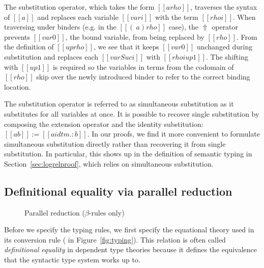 \documentclass[acmsmall,screen=true,
\ifpublic review=false\else,review=true\fi
  ,anonymous=\ifanonymous true\else false\fi]{acmart}
\newcommand{\scw}[1]{}
\begin{document}
The substitution operator, which takes the form $[[a {rho}]]$,
traverses the syntax of $[[a]]$ and replaces each variable $[[var i]]$
with the term $[[rho i]]$. When traversing under binders (e.g. in the
$[[(\ a) { rho }]]$ case), the $\Uparrow$ operator prevents $[[var
0]]$, the bound variable, from being replaced by
$[[rho]]$. From the definition of $[[up rho]]$, we see that it keeps
$[[var 0]]$ unchanged during substitution and replaces each $[[var
Suc i]]$ with $[[rho i {up 1}]]$. The shifting with $[[up 1]]$
is required so the variables in terms from the codomain of $[[rho]]$ skip over
the newly introduced binder to refer to the correct binding
location.

The substitution operator is referred to as simultaneous substitution as it
substitutes for all variables at once. It is possible to recover single
substitution by composing the extension operator and the identity
substitution: $[[a { b }]] := [[a { idtm .: b }]]$. In our proofs, we find it
more convenient to formulate simultaneous substitution directly rather than
recovering it from single substitution.  In particular, this shows up in the
definition of semantic typing in Section~\ref{sec:logrelproof}, which relies
on simultaneous substitution.

\subsection{Definitional equality via parallel reduction}

\begin{figure}[h]
\begin{minipage}{0.9\textwidth}
\end{minipage}
\caption{Parallel reduction ($\beta$-rules only) }
\label{fig:par}
\end{figure}

Before we specify the typing rules, we first specify the equational theory
used in its conversion rule ( in Figure~\ref{fig:typing}). This
relation is often called \textit{definitional equality} in dependent type theories
because it defines the equivalence that the syntactic type system works
up to.
\end{document}
